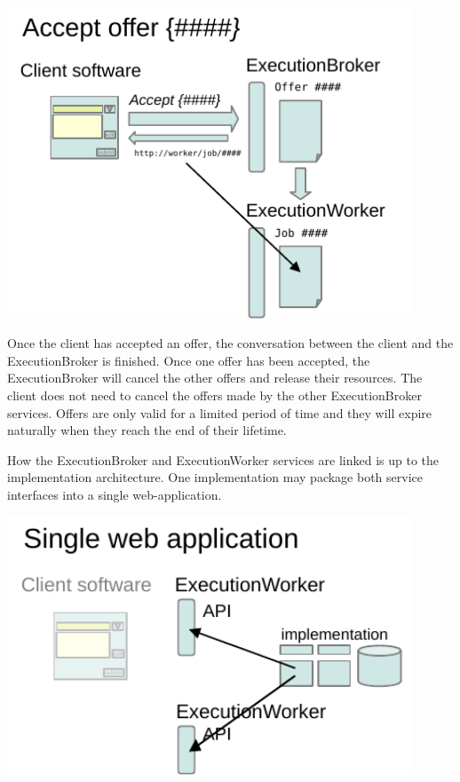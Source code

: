 \documentclass[11pt,a4paper]{ivoa}
\newcommand{\execbrokerclass} {ExecutionBroker}
\newcommand{\execworkerclass} {ExecutionWorker}
\begin{document}

\includegraphics[width=0.9\textwidth]{diagrams/accept-offer.pdf}

Once the client has accepted an offer, the conversation between the client and the \execbrokerclass{}
is finished. Once one offer has been accepted, the \execbrokerclass{} will cancel the other offers and
release their resources.
The client does not need to cancel the offers made by the other \execbrokerclass{} services.
Offers are only valid for a limited period of time and they will expire naturally when they reach
the end of their lifetime.

How the \execbrokerclass{} and \execworkerclass{} services are linked is up to the implementation architecture.
One implementation may package both service interfaces into a single web-application.

\includegraphics[width=0.9\textwidth]{diagrams/single-webapp.pdf}
\end{document}
